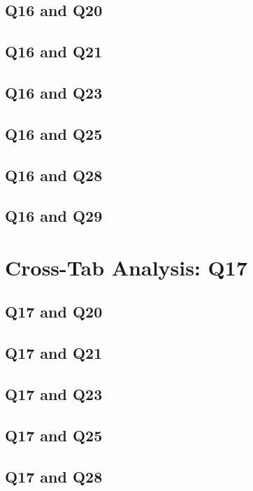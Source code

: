 \documentclass{report}
\begin{document}
\section{Q16 and Q20}\clearpage
\section{Q16 and Q21}\clearpage
\section{Q16 and Q23}\clearpage
\section{Q16 and Q25}\clearpage
\section{Q16 and Q28}\clearpage
\section{Q16 and Q29}\clearpage

\chapter{Cross-Tab Analysis: Q17}

\section{Q17 and Q20}\clearpage
\section{Q17 and Q21}\clearpage
\section{Q17 and Q23}\clearpage
\section{Q17 and Q25}\clearpage
\section{Q17 and Q28}\clearpage
\end{document}
